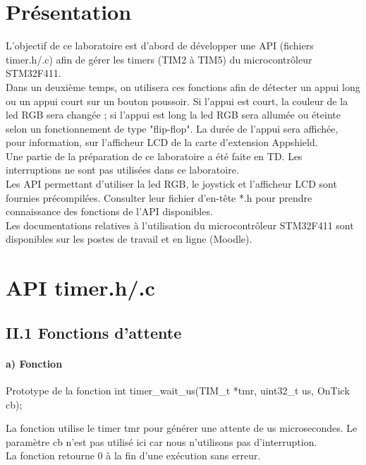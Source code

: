 \chapter{Présentation}

L'objectif de ce laboratoire est d'abord de développer une API (fichiers timer.h/.c) afin de gérer les timers (TIM2 à TIM5) du microcontrôleur STM32F411.\\
Dans un deuxième temps, on utilisera ces fonctions afin de détecter un appui long ou un appui court sur un bouton poussoir. Si l'appui est court, la couleur de la led RGB sera changée ; si l'appui est long la led RGB sera allumée ou éteinte selon un fonctionnement de type "flip-flop". La durée de l'appui sera affichée, pour information, sur l'afficheur LCD de la carte d'extension Appshield. \\

Une partie de la préparation de ce laboratoire a été faite en TD. Les interruptions ne sont pas utilisées dans ce laboratoire. \\
Les API permettant d'utiliser la led RGB, le joystick et l'afficheur LCD sont fournies
précompilées. Consulter leur fichier d'en-tête *.h pour prendre connaissance des fonctions de l'API disponibles.\\
Les documentations relatives à l'utilisation du microcontrôleur STM32F411 sont disponibles
sur les postes de travail et en ligne (Moodle).



\chapter{API timer.h/.c}


\section{II.1 Fonctions d'attente}


\subsubsection{a) Fonction}

\begin{Cpp}{Prototype de la fonction} 
int timer_wait_us(TIM_t *tmr, uint32_t us, OnTick cb);
\end{Cpp}

La fonction utilise le timer tmr pour générer une attente de us microsecondes. Le paramètre cb n'est pas utilisé ici car nous n'utilisons pas d'interruption.\\
La fonction retourne 0 à la fin d'une exécution sans erreur. \\


